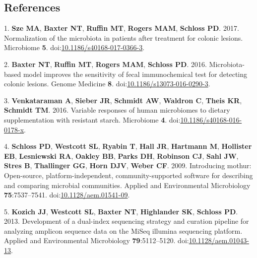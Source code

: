 \documentclass[11pt,]{article}
\begin{document}
\newpage

\subsection{References}\label{references}

\hypertarget{refs}{}
\hypertarget{ref-normalization_sze2017}{}
1. \textbf{Sze MA}, \textbf{Baxter NT}, \textbf{Ruffin MT},
\textbf{Rogers MAM}, \textbf{Schloss PD}. 2017. Normalization of the
microbiota in patients after treatment for colonic lesions. Microbiome
\textbf{5}.
doi:\href{https://doi.org/10.1186/s40168-017-0366-3}{10.1186/s40168-017-0366-3}.

\hypertarget{ref-crc_model_baxter2016}{}
2. \textbf{Baxter NT}, \textbf{Ruffin MT}, \textbf{Rogers MAM},
\textbf{Schloss PD}. 2016. Microbiota-based model improves the
sensitivity of fecal immunochemical test for detecting colonic lesions.
Genome Medicine \textbf{8}.
doi:\href{https://doi.org/10.1186/s13073-016-0290-3}{10.1186/s13073-016-0290-3}.

\hypertarget{ref-scfa_measures_venkataraman2016}{}
3. \textbf{Venkataraman A}, \textbf{Sieber JR}, \textbf{Schmidt AW},
\textbf{Waldron C}, \textbf{Theis KR}, \textbf{Schmidt TM}. 2016.
Variable responses of human microbiomes to dietary supplementation with
resistant starch. Microbiome \textbf{4}.
doi:\href{https://doi.org/10.1186/s40168-016-0178-x}{10.1186/s40168-016-0178-x}.

\hypertarget{ref-Schloss2009}{}
4. \textbf{Schloss PD}, \textbf{Westcott SL}, \textbf{Ryabin T},
\textbf{Hall JR}, \textbf{Hartmann M}, \textbf{Hollister EB},
\textbf{Lesniewski RA}, \textbf{Oakley BB}, \textbf{Parks DH},
\textbf{Robinson CJ}, \textbf{Sahl JW}, \textbf{Stres B},
\textbf{Thallinger GG}, \textbf{Horn DJV}, \textbf{Weber CF}. 2009.
Introducing mothur: Open-source, platform-independent,
community-supported software for describing and comparing microbial
communities. Applied and Environmental Microbiology
\textbf{75}:7537--7541.
doi:\href{https://doi.org/10.1128/aem.01541-09}{10.1128/aem.01541-09}.

\hypertarget{ref-Kozich2013}{}
5. \textbf{Kozich JJ}, \textbf{Westcott SL}, \textbf{Baxter NT},
\textbf{Highlander SK}, \textbf{Schloss PD}. 2013. Development of a
dual-index sequencing strategy and curation pipeline for analyzing
amplicon sequence data on the MiSeq illumina sequencing platform.
Applied and Environmental Microbiology \textbf{79}:5112--5120.
doi:\href{https://doi.org/10.1128/aem.01043-13}{10.1128/aem.01043-13}.
\end{document}

